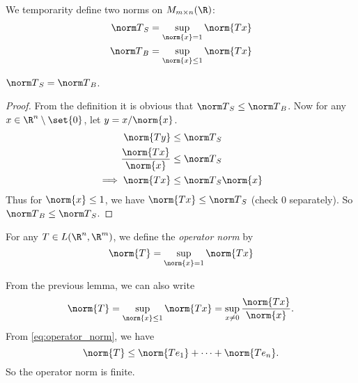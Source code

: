We temporarity define two norms on $M_{m \times n}(\R)$:
\begin{align*}
    {\norm T}_S &= \sup_{\norm{x} = 1} \norm{Tx} \\
    {\norm T}_B &= \sup_{\norm{x} \le 1} \norm{Tx}
\end{align*}
\begin{lemma} \label{lem:operator_norm}
    ${\norm T}_S = {\norm T}_B$.
\end{lemma}
\begin{proof}
    From the definition it is obvious that ${\norm T}_S \le {\norm T}_B$.
    Now for any $x \in \R^n \setminus \set{0}$, let $y = x/\norm{x}$.
    \begin{align*}
        \norm{Ty} &\le {\norm T}_S \\
        \frac{\norm{Tx}}{\norm{x}} &\le {\norm T}_S \\
        \implies \norm{Tx} &\le {\norm T}_S \norm{x}
    \end{align*} Thus for $\norm{x} \le 1$,
    we have $\norm{Tx} \le {\norm T}_S$ (check $0$ separately).
    So ${\norm T}_B \le {\norm T}_S$.
\end{proof}

\begin{definition*} \label{def:operator_norm}
    For any $T \in L(\R^n, \R^m)$, we define the \emph{operator norm} by \[
        \norm{T} = \sup_{\norm{x} = 1} \norm{Tx}
    \]
\end{definition*}
From the previous lemma, we can also write
\[
    \norm{T} = \sup_{\norm{x} \le 1} \norm{Tx}
        = \sup_{x \ne 0} \frac{\norm{Tx}}{\norm{x}}.
\]
From \cref{eq:operator_norm}, we have \[
    \norm{T} \le \norm{Te_1} + \cdots + \norm{Te_n}.
\] So the operator norm is finite.

